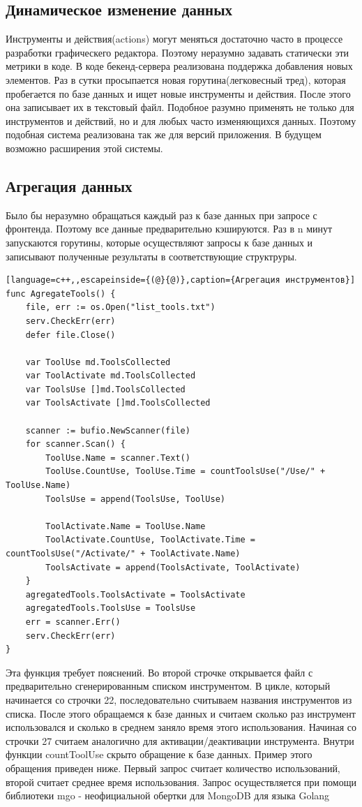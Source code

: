 \subsection{Динамическое изменение данных}
Инструменты и действия(actions) могут меняться достаточно часто в процессе разработки графическего редактора. Поэтому неразумно задавать статически эти метрики в коде. В коде бекенд-сервера реализована поддержка добавления новых элементов. Раз в сутки просыпается новая горутина(легковесный тред), которая пробегается по базе данных и ищет новые инструменты и действия. После этого она записывает их в текстовый файл.  Подобное разумно применять не только для инструментов и действий, но и для любых часто изменяющихся данных. Поэтому подобная система реализована так же  для версий приложения. В будущем возможно расширения этой системы.
\subsection{Агрегация данных}
Было бы неразумно обращаться каждый раз к базе данных при запросе с фронтенда. Поэтому все данные предварительно кэшируются. Раз в n минут запускаются горутины, которые осуществляют запросы к базе данных и записывают полученные результаты в соответствующие структруры.
\begin{lstlisting}[language=c++,,escapeinside={(@}{@)},caption={Агрегация инструментов}] 
func AgregateTools() {
	file, err := os.Open("list_tools.txt")
	serv.CheckErr(err)
	defer file.Close()
	
	var ToolUse md.ToolsCollected
	var ToolActivate md.ToolsCollected
	var ToolsUse []md.ToolsCollected
	var ToolsActivate []md.ToolsCollected
	
	scanner := bufio.NewScanner(file)
	for scanner.Scan() {
		ToolUse.Name = scanner.Text()
		ToolUse.CountUse, ToolUse.Time = countToolsUse("/Use/" + ToolUse.Name)
		ToolsUse = append(ToolsUse, ToolUse)
		
		ToolActivate.Name = ToolUse.Name
		ToolActivate.CountUse, ToolActivate.Time = countToolsUse("/Activate/" + ToolActivate.Name)
		ToolsActivate = append(ToolsActivate, ToolActivate)
	}
	agregatedTools.ToolsActivate = ToolsActivate
	agregatedTools.ToolsUse = ToolsUse
	err = scanner.Err()
	serv.CheckErr(err)	
}
\end{lstlisting}
Эта функция требует пояснений. Во второй строчке открывается файл с предварительно сгенерированным списком инструментом. В цикле, который начинается со строчки 22, последовательно считываем названия инструментов из списка. После этого  обращаемся к базе данных и считаем сколько раз инструмент использовался и сколько в среднем заняло время этого использования. Начиная со строчки 27 считаем аналогично для активации/деактивации инструмента. Внутри функции countToolUse скрыто обращение к базе данных. Пример этого обращения приведен ниже. Первый запрос считает количество использований, второй считает среднее время использования. Запрос осуществляется при помощи библиотеки mgo - неофициальной обертки для MongoDB для языка Golang\cite{book1}
